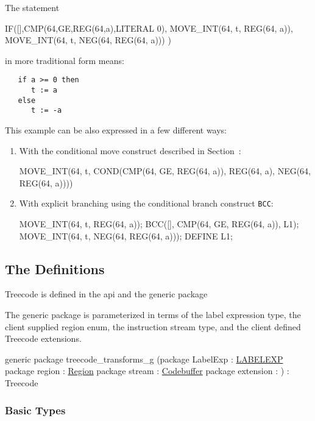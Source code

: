 The statement
\begin{SML}
   IF([],CMP(64,GE,REG(64,a),LITERAL 0),
         MOVE_INT(64, t, REG(64, a)),
         MOVE_INT(64, t, NEG(64, REG(64, a)))
     )
\end{SML}
in more traditional form means:
\begin{verbatim}
   if a >= 0 then 
      t := a
   else
      t := -a
\end{verbatim} 
This example can be also expressed in a few different ways: 
\begin{enumerate}
   \item With the conditional move construct described in 
Section~:
     \begin{SML}
    MOVE_INT(64, t, 
       COND(CMP(64, GE, REG(64, a)), 
            REG(64, a), 
            NEG(64, REG(64, a))))
     \end{SML}
  \item With explicit branching using the conditional branch
construct \verb|BCC|:
    \begin{SML}
     MOVE_INT(64, t, REG(64, a));
     BCC([], CMP(64, GE, REG(64, a)), L1);
     MOVE_INT(64, t, NEG(64, REG(64, a)));
     DEFINE L1;
    \end{SML}
\end{enumerate}
\subsection{The Definitions}

Treecode is defined in the api 
and the generic package 

The generic package  is parameterized in terms of
the label expression type, the client supplied region enum,
the instruction stream type, and the client defined Treecode extensions.
\begin{SML}
  generic package treecode_transforms_g
    (package LabelExp : \href{labelexp.html}{LABELEXP}
     package region : \href{regions.html}{Region}
     package stream : \href{streams.html}{Codebuffer}
     package extension : 
    ) : Treecode
\end{SML}

\subsubsection{Basic Types}


